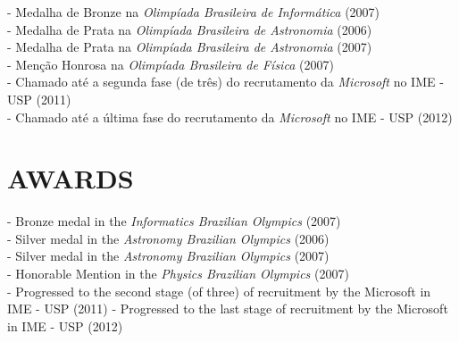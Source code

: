 \documentclass[]{res} %
\def \divspace{6pt}
\begin{document}
\begin{resume}
    - Medalha de Bronze na {\sl Olimpíada Brasileira de Informática} (2007) \\
    - Medalha de Prata na {\sl Olimpíada Brasileira de Astronomia} (2006) \\
    - Medalha de Prata na {\sl Olimpíada Brasileira de Astronomia} (2007) \\
    - Menção Honrosa na {\sl Olimpíada Brasileira de Física} (2007) \\
    - Chamado até a segunda fase (de três) do recrutamento da {\sl Microsoft} no IME - USP (2011) \\
    - Chamado até a última fase do recrutamento da {\sl Microsoft} no IME - USP (2012)
\else
    \section{AWARDS \hspace{\divspace} }

    - Bronze medal in the {\sl Informatics Brazilian Olympics} (2007) \\
    - Silver medal in the {\sl Astronomy Brazilian Olympics} (2006) \\
    - Silver medal in the {\sl Astronomy Brazilian Olympics} (2007) \\
    - Honorable Mention in the {\sl Physics Brazilian Olympics} (2007) \\
    - Progressed to the second stage (of three) of recruitment by the Microsoft in IME - USP (2011)
    - Progressed to the last stage of recruitment by the Microsoft in IME - USP (2012)
\fi

\end{resume}
\end{document}
